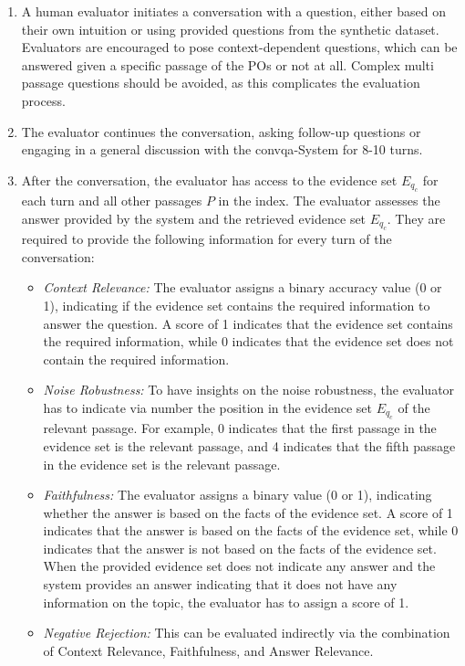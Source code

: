 \begin{enumerate}
    \item A human evaluator initiates a conversation with a question, either based on their own intuition or using provided questions from the synthetic dataset. Evaluators are encouraged to pose context-dependent questions, which can be answered given a specific passage of the POs or not at all. Complex multi passage questions should be avoided, as this complicates the evaluation process.
    \item The evaluator continues the conversation, asking follow-up questions or engaging in a general discussion with the \gls{convqa}-System for 8-10 turns.
    \item After the conversation, the evaluator has access to the evidence set $E_{q_c}$ for each turn and all other passages $P$ in the index. The evaluator assesses the answer provided by the system and the retrieved evidence set $E_{q_c}$. They are required to provide the following information for every turn of the conversation:
        \begin{itemize}
            \item \textit{Context Relevance:} The evaluator assigns a binary accuracy value (0 or 1), indicating if the evidence set contains the required information to answer the question. A score of 1 indicates that the evidence set contains the required information, while 0 indicates that the evidence set does not contain the required information.
            \item \textit{Noise Robustness:} To have insights on the noise robustness, the evaluator has to indicate via number the position in the evidence set $E_{q_c}$ of the relevant passage. For example, 0 indicates that the first passage in the evidence set is the relevant passage, and 4 indicates that the fifth passage in the evidence set is the relevant passage.
            \item \textit{Faithfulness:} The evaluator assigns a binary value (0 or 1), indicating whether the answer is based on the facts of the evidence set. A score of 1 indicates that the answer is based on the facts of the evidence set, while 0 indicates that the answer is not based on the facts of the evidence set. When the provided evidence set does not indicate any answer and the system provides an answer indicating that it does not have any information on the topic, the evaluator has to assign a score of 1.
            \item \textit{Negative Rejection:} This can be evaluated indirectly via the combination of Context Relevance, Faithfulness, and Answer Relevance.

\end{itemize}
\end{enumerate}
